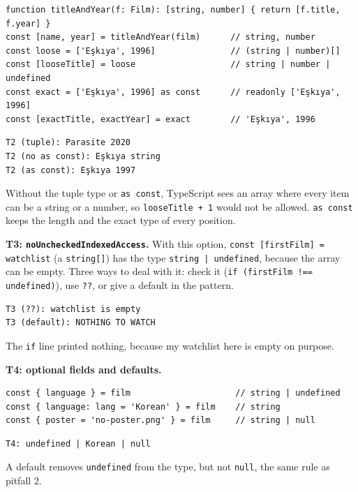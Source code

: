 \documentclass[
]{article}
\newcommand{\passthrough}[1]{#1}
\begin{document}
\begin{lstlisting}
function titleAndYear(f: Film): [string, number] { return [f.title, f.year] }
const [name, year] = titleAndYear(film)      // string, number
const loose = ['Eşkıya', 1996]               // (string | number)[]
const [looseTitle] = loose                   // string | number | undefined
const exact = ['Eşkıya', 1996] as const      // readonly ['Eşkıya', 1996]
const [exactTitle, exactYear] = exact        // 'Eşkıya', 1996
\end{lstlisting}

\begin{lstlisting}
T2 (tuple): Parasite 2020
T2 (no as const): Eşkıya string
T2 (as const): Eşkıya 1997
\end{lstlisting}

Without the tuple type or \passthrough{\lstinline!as const!}, TypeScript
sees an array where every item can be a string or a number, so
\passthrough{\lstinline!looseTitle + 1!} would not be allowed.
\passthrough{\lstinline!as const!} keeps the length and the exact type
of every position.

\textbf{T3: \passthrough{\lstinline!noUncheckedIndexedAccess!}.} With
this option, \passthrough{\lstinline!const [firstFilm] = watchlist!} (a
\passthrough{\lstinline!string[]!}) has the type
\passthrough{\lstinline!string | undefined!}, because the array can be
empty. Three ways to deal with it: check it
(\passthrough{\lstinline"if (firstFilm !== undefined)"}), use
\passthrough{\lstinline!??!}, or give a default in the pattern.

\begin{lstlisting}
T3 (??): watchlist is empty
T3 (default): NOTHING TO WATCH
\end{lstlisting}

The \passthrough{\lstinline!if!} line printed nothing, because my
watchlist here is empty on purpose.

\textbf{T4: optional fields and defaults.}

\begin{lstlisting}
const { language } = film                     // string | undefined
const { language: lang = 'Korean' } = film    // string
const { poster = 'no-poster.png' } = film     // string | null
\end{lstlisting}

\begin{lstlisting}
T4: undefined | Korean | null
\end{lstlisting}

A default removes \passthrough{\lstinline!undefined!} from the type, but
not \passthrough{\lstinline!null!}, the same rule as pitfall 2.
\end{document}
